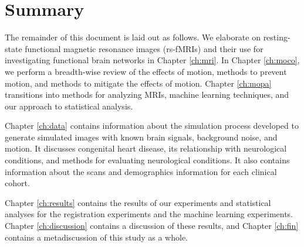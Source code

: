 \section{Summary}


The remainder of this document is laid out as follows. We elaborate on resting-state functional magnetic resonance images (rs-fMRIs) and their use for investigating functional brain networks in Chapter \ref{ch:mri}. In Chapter \ref{ch:moco}, we perform a breadth-wise review of the effects of motion, methods to prevent motion, and methods to mitigate the effects of motion.
Chapter \ref{ch:mopa} transitions into methods for analyzing MRIs, machine learning techniques, and our approach to statistical analysis. 

Chapter \ref{ch:data} contains information about the simulation process developed to generate simulated images with known brain signals, background noise, and motion. It discusses congenital heart disease, its relationship with neurological conditions, and methods for evaluating neurological conditions. It also contains information about the scans and demographics information for each clinical cohort. 

Chapter \ref{ch:results} contains the results of our experiments and statistical analyses for the registration experiments and the machine learning experiments. Chapter \ref{ch:discussion} contains a discussion of these results, and Chapter \ref{ch:fin} contains a metadiscussion of this study as a whole.
